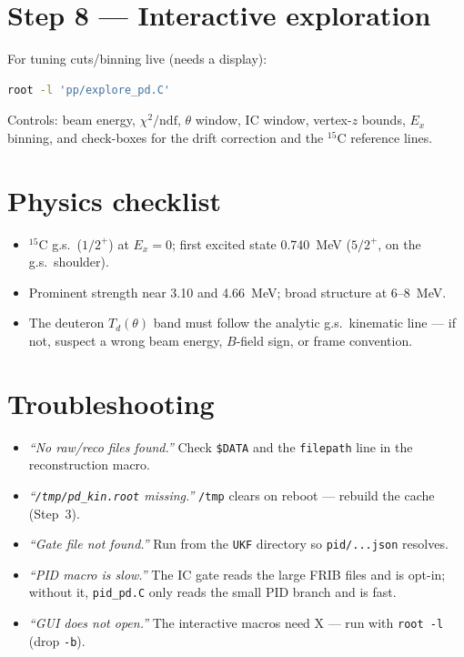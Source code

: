 \documentclass[11pt]{article}
\newcommand{\code}[1]{\texttt{#1}}
\begin{document}
\section{Step 8 --- Interactive exploration}
For tuning cuts/binning live (needs a display):
\begin{lstlisting}[language=bash]
root -l 'pp/explore_pd.C'
\end{lstlisting}
Controls: beam energy, $\chi^2/\mathrm{ndf}$, $\theta$ window, IC window, vertex-$z$ bounds, $E_x$
binning, and check-boxes for the drift correction and the $^{15}$C reference lines.

\section{Physics checklist}
\begin{itemize}[nosep]
  \item $^{15}$C g.s.\ ($1/2^+$) at $E_x=0$; first excited state 0.740~MeV ($5/2^+$, on the g.s.\ shoulder).
  \item Prominent strength near 3.10 and 4.66~MeV; broad structure at 6--8~MeV.
  \item The deuteron $T_d(\theta)$ band must follow the analytic g.s.\ kinematic line --- if not,
        suspect a wrong beam energy, $B$-field sign, or frame convention.
\end{itemize}

\section{Troubleshooting}
\begin{itemize}[nosep]
  \item \emph{``No raw/reco files found.''} Check \code{\$DATA} and the \code{filepath} line in the
        reconstruction macro.
  \item \emph{``\code{/tmp/pd\_kin.root} missing.''} \code{/tmp} clears on reboot --- rebuild the cache (Step~3).
  \item \emph{``Gate file not found.''} Run from the \code{UKF} directory so \code{pid/...json} resolves.
  \item \emph{``PID macro is slow.''} The IC gate reads the large FRIB files and is opt-in; without
        it, \code{pid\_pd.C} only reads the small PID branch and is fast.
  \item \emph{``GUI does not open.''} The interactive macros need X --- run with \code{root -l} (drop \code{-b}).
\end{itemize}
\end{document}
